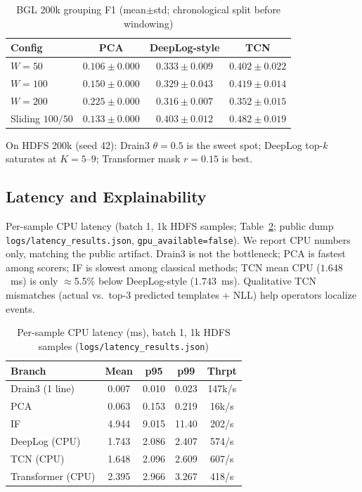 \documentclass[runningheads]{llncs}
\begin{document}
\begin{table}[htbp]
\caption{BGL 200k grouping F1 (mean$\pm$std; chronological split before windowing)}
\centering
\scriptsize
\begin{tabular}{lccc}
\toprule
\textbf{Config} & \textbf{PCA} & \textbf{DeepLog-style} & \textbf{TCN} \\
\midrule
$W{=}50$ & $0.106\pm0.000$ & $0.333\pm0.009$ & $0.402\pm0.022$ \\
$W{=}100$ & $0.150\pm0.000$ & $0.329\pm0.043$ & $0.419\pm0.014$ \\
$W{=}200$ & $0.225\pm0.000$ & $0.316\pm0.007$ & $0.352\pm0.015$ \\
Sliding $100/50$ & $0.133\pm0.000$ & $0.403\pm0.012$ & $\mathbf{0.482\pm0.019}$ \\
\bottomrule
\end{tabular}
\label{tab_grouping}
\end{table}

On HDFS 200k (seed 42): Drain3 $\theta{=}0.5$ is the sweet spot; DeepLog top-$k$ saturates at $K{=}5$--$9$; Transformer mask $r{=}0.15$ is best.

\subsection{Latency and Explainability}
Per-sample CPU latency (batch 1, 1k HDFS samples; Table~\ref{tab_latency}; public dump \texttt{logs/latency\_results.json}, \texttt{gpu\_available=false}). We report CPU numbers only, matching the public artifact. Drain3 is not the bottleneck; PCA is fastest among scorers; IF is slowest among classical methods; TCN mean CPU ($1.648$~ms) is only $\approx$5.5\% below DeepLog-style ($1.743$~ms). Qualitative TCN mismatches (actual vs.\ top-3 predicted templates + NLL) help operators localize events.

\begin{table}[htbp]
\caption{Per-sample CPU latency (ms), batch 1, 1k HDFS samples (\texttt{logs/latency\_results.json})}
\centering
\scriptsize
\setlength{\tabcolsep}{3pt}
\begin{tabular}{lcccc}
\toprule
\textbf{Branch} & Mean & p95 & p99 & Thrpt \\
\midrule
Drain3 (1 line) & 0.007 & 0.010 & 0.023 & 147k/s \\
PCA & 0.063 & 0.153 & 0.219 & 16k/s \\
IF & 4.944 & 9.015 & 11.40 & 202/s \\
DeepLog (CPU) & 1.743 & 2.086 & 2.407 & 574/s \\
TCN (CPU) & 1.648 & 2.096 & 2.609 & 607/s \\
Transformer (CPU) & 2.395 & 2.966 & 3.267 & 418/s \\
\bottomrule
\end{tabular}
\label{tab_latency}
\end{table}
\end{document}
